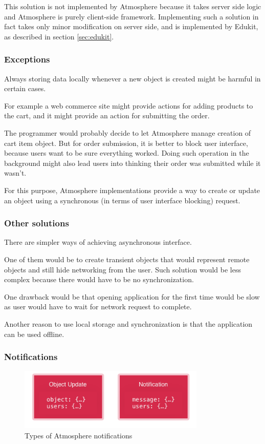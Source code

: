This solution is not implemented by Atmosphere because it takes server side logic and Atmosphere is purely client-side framework. Implementing such a solution in fact takes only minor modification on server side, and is implemented by Edukit, as described in section \ref{sec:edukit}.

\subsubsection{Exceptions}

Always storing data locally whenever a new object is created might be harmful in certain cases.

For example a web commerce site might provide actions for adding products to the cart, and it might provide an action for submitting the order.

The programmer would probably decide to let Atmosphere manage creation of cart item object. But for order submission, it is better to block user interface, because users want to be sure everything worked. Doing such operation in the background might also lead users into thinking their order was submitted while it wasn't.

For this purpose, Atmosphere implementations provide a way to create or update an object using a synchronous (in terms of user interface blocking) request. 

\subsubsection{Other solutions}

There are simpler ways of achieving asynchronous interface.

One of them would be to create transient objects that would represent remote objects and still hide networking from the user. Such solution would be less complex because there would have to be no synchronization.

 One drawback would be that opening application for the first time would be slow as user would have to wait for network request to complete. 

Another reason to use local storage and synchronization is that the application can be used offline.

\subsubsection{Notifications}

\begin{figure}[htbp]
  \centering
    \includegraphics[width=3.5in]{figures/Notifications.png}
  \caption{Types of Atmosphere notifications}
  \label{fig:figures_NotificationServer}
\end{figure}


